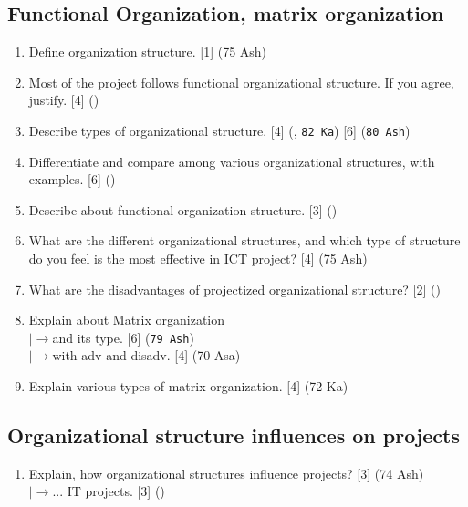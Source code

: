 \documentclass[12pt]{article}
\newcommand{\lb}{\\$\left|\rightarrow\right.$}
\begin{document}
  \subsection{Functional Organization, matrix organization}
    \begin{enumerate}
      \item Define organization structure. \hfill [1] (75 Ash)

      \item Most of the project follows functional organizational structure. If you agree, justify. \hfill [4] ()

      \item Describe types of organizational structure. \hfill [4] (, \texttt{82 Ka}) [6] (\texttt{80 Ash})

      \item Differentiate and compare among various organizational structures, with examples. \hfill [6] ()

      \item Describe about functional organization structure. \hfill [3] ()

      \item What are the different organizational structures, and which type of structure do you feel is the most effective in ICT project? \hfill [4] (75 Ash)

      \item What are the disadvantages of projectized organizational structure? \hfill [2] ()

      \item Explain about Matrix organization
        \lb and its type. \hfill [6] (\texttt{79 Ash})
        \lb with adv and disadv. \hfill [4] (70 Asa)

      \item Explain various types of matrix organization. \hfill [4] (72 Ka)
    \end{enumerate}

  \subsection{Organizational structure influences on projects}
    \begin{enumerate}
      \item Explain, how organizational structures influence projects? \hfill [3] (74 Ash)
        \lb ... IT projects. \hfill [3] () 
    \end{enumerate}
\end{document}

